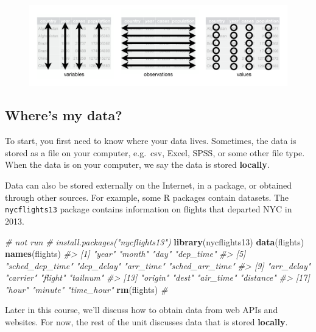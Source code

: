 \documentclass[]{book}
\newenvironment{Shaded}{\begin{snugshade}}{\end{snugshade}}
\newcommand{\KeywordTok}[1]{\textcolor[rgb]{0.13,0.29,0.53}{\textbf{#1}}}
\newcommand{\CommentTok}[1]{\textcolor[rgb]{0.56,0.35,0.01}{\textit{#1}}}
\newcommand{\NormalTok}[1]{#1}
\begin{document}
\begin{figure}
\centering
\includegraphics{img/tidy-1.png}
\caption{}
\end{figure}

\subsection{Where's my data?}\label{wheres-my-data}

To start, you first need to know where your data lives. Sometimes, the
data is stored as a file on your computer, e.g.~csv, Excel, SPSS, or
some other file type. When the data is on your computer, we say the data
is stored \textbf{locally}.

Data can also be stored externally on the Internet, in a package, or
obtained through other sources. For example, some R packages contain
datasets. The \texttt{nycflights13} package contains information on
flights that departed NYC in 2013.

\begin{Shaded}
\begin{Highlighting}[]
\CommentTok{# not run}
\CommentTok{# install.packages("nycflights13")}
\KeywordTok{library}\NormalTok{(nycflights13)}
\KeywordTok{data}\NormalTok{(flights)}
\KeywordTok{names}\NormalTok{(flights)}
\CommentTok{#>  [1] "year"           "month"          "day"            "dep_time"      }
\CommentTok{#>  [5] "sched_dep_time" "dep_delay"      "arr_time"       "sched_arr_time"}
\CommentTok{#>  [9] "arr_delay"      "carrier"        "flight"         "tailnum"       }
\CommentTok{#> [13] "origin"         "dest"           "air_time"       "distance"      }
\CommentTok{#> [17] "hour"           "minute"         "time_hour"}
\KeywordTok{rm}\NormalTok{(flights)}
\CommentTok{# }
\end{Highlighting}
\end{Shaded}

Later in this course, we'll discuss how to obtain data from web APIs and
websites. For now, the rest of the unit discusses data that is stored
\textbf{locally}.
\end{document}
